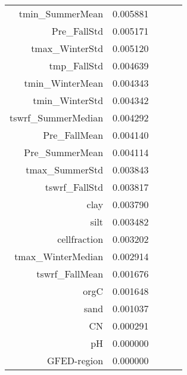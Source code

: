 \begin{tabular}{rrrrr}
tmin_SummerMean & 0.005881 \\
Pre_FallStd & 0.005171 \\
tmax_WinterStd & 0.005120 \\
tmp_FallStd & 0.004639 \\
tmin_WinterMean & 0.004343 \\
tmin_WinterStd & 0.004342 \\
tswrf_SummerMedian & 0.004292 \\
Pre_FallMean & 0.004140 \\
Pre_SummerMean & 0.004114 \\
tmax_SummerStd & 0.003843 \\
tswrf_FallStd & 0.003817 \\
clay & 0.003790 \\
silt & 0.003482 \\
cellfraction & 0.003202 \\
tmax_WinterMedian & 0.002914 \\
tswrf_FallMean & 0.001676 \\
orgC & 0.001648 \\
sand & 0.001037 \\
CN & 0.000291 \\
pH & 0.000000 \\
GFED-region & 0.000000 \\
\bottomrule
\end{tabular}
